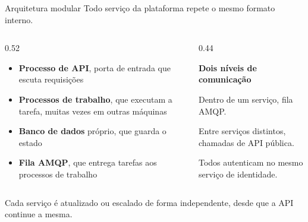 \documentclass[aspectratio=169]{beamer}
\begin{document}
\begin{frame}{Arquitetura modular}
  Todo serviço da plataforma repete o mesmo formato interno.
  \vspace{0.2cm}
  \begin{columns}[T]
    \begin{column}{0.52\textwidth}
      \begin{itemize}
        \item \textbf{Processo de API}, porta de entrada que escuta requisições
        \item \textbf{Processos de trabalho}, que executam a tarefa, muitas vezes em outras máquinas
        \item \textbf{Banco de dados} próprio, que guarda o estado
        \item \textbf{Fila AMQP}, que entrega tarefas aos processos de trabalho
      \end{itemize}
    \end{column}
    \begin{column}{0.44\textwidth}
      \begin{tcolorbox}[colback=structure.fg!10, colframe=structure.fg!60, arc=2mm, fontupper=\footnotesize]
        \textbf{Dois níveis de comunicação}
        \vspace{0.15cm}

        Dentro de um serviço, fila AMQP.

        Entre serviços distintos, chamadas de API pública.
        \vspace{0.1cm}

        Todos autenticam no mesmo serviço de identidade.
      \end{tcolorbox}
    \end{column}
  \end{columns}
  \vspace{0.2cm}
  {\footnotesize Cada serviço é atualizado ou escalado de forma independente, desde que a API continue a mesma.}
\end{frame}
\end{document}
